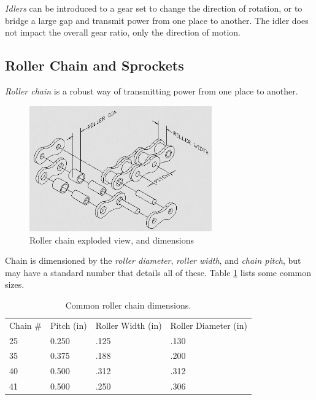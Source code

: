 \textit{Idlers} can be introduced to a gear set to change the direction of rotation, or to bridge a large gap and transmit power from one place to another. The idler does not impact the overall gear ratio, only the direction of motion.

\newpage

\subsection{Roller Chain and Sprockets}

\textit{Roller chain} is a robust way of transmitting power from one place to another. 

\begin{figure}[H]
	\includegraphics[width=0.7\textwidth]{imgs/rollerchain_nomenclature.png}
	\caption{Roller chain exploded view, and dimensions}
\end{figure}

Chain is dimensioned by the \textit{roller diameter}, \textit{roller width}, and \textit{chain pitch}, but may have a standard number that details all of these. Table \ref{table:chaindims} lists some common sizes.

\begin{table}[H] 
\begin{tabular}{llll}
Chain \# & Pitch (in) & Roller Width (in) & Roller Diameter (in) \\
25       & 0.250      & .125              & .130                 \\
35       & 0.375      & .188              & .200                 \\
40       & 0.500      & .312              & .312                 \\
41       & 0.500      & .250              & .306                
\end{tabular}
\caption{Common roller chain dimensions.}
\label{table:chaindims}
\end{table}

